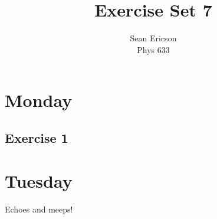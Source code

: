 \documentclass[12pt]{article}
\begin{document}
	
\title{Exercise Set 7}
\author{Sean Ericson \\ Phys 633}
\maketitle

\section*{Monday}
\subsection*{Exercise 1}


\section*{Tuesday}
Echoes and meeps!
\end{document}
